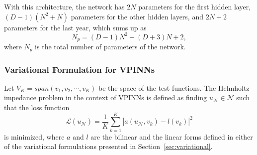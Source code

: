 With this architecture, the network has $2N$ parameters for the first hidden layer, $(D-1)(N^2+N)$ parameters for the other hidden layers, and $2N+2$ parameters for the last year, which sums up as
\begin{equation}
    \label{eq:vpinnsparameters}
    N_p = (D-1)N^2+(D+3)N+2,
\end{equation}
where $N_p$ is the total number of parameters of the network.

\subsubsection{Variational Formulation for VPINNs}\label{sec:vpinnsformulation}
Let $V_K = span(v_1, v_2, \cdots, v_K)$ be the space of the test functions. The Helmholtz impedance problem in the context of VPINNs is defined as finding $u_{\mathcal{N}} \in \mathcal{N}$ such that the loss function
\begin{equation}
    \label{eq:lossfunction}
    \mathcal{L}(u_{\mathcal{N}}) = \frac{1}{K} \sum_{k=1}^{K}{\left|a(u_{\mathcal{N}},v_k)-l(v_k)\right| ^2}
\end{equation}
is minimized, where $a$ and $l$ are the bilinear and the linear forms defined in either of the variational formulations presented in Section~\ref{sec:variational}.

